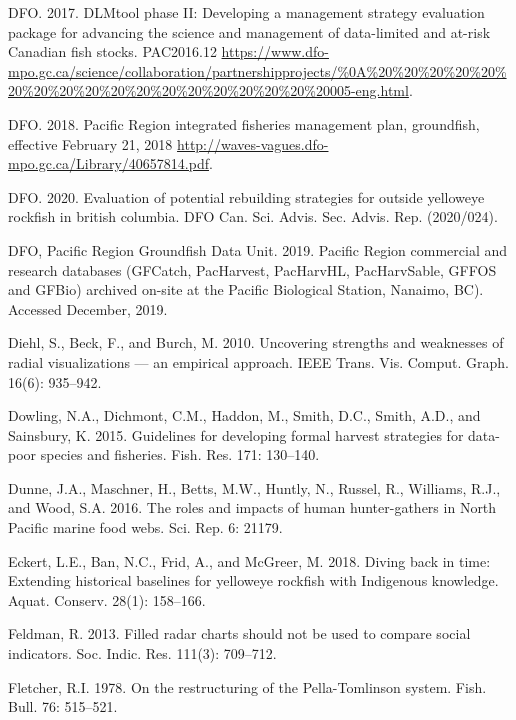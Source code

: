 \documentclass[11pt]{book}
\begin{document}
\leavevmode\hypertarget{ref-dfo_dlmtool_2017}{}%
DFO. 2017. DLMtool phase II: Developing a management strategy evaluation package for advancing the science and management of data-limited and at-risk Canadian fish stocks. PAC2016.12 \url{https://www.dfo-mpo.gc.ca/science/collaboration/partnershipprojects/\%0A\%20\%20\%20\%20\%20\%20\%20\%20\%20\%20\%20\%20\%20\%20\%20\%20\%20\%20005-eng.html}.

\leavevmode\hypertarget{ref-ifmp2018}{}%
DFO. 2018. Pacific Region integrated fisheries management plan, groundfish, effective February 21, 2018 \url{http://waves-vagues.dfo-mpo.gc.ca/Library/40657814.pdf}.

\leavevmode\hypertarget{ref-dfo2020}{}%
DFO. 2020. Evaluation of potential rebuilding strategies for outside yelloweye rockfish in british columbia. DFO Can. Sci. Advis. Sec. Advis. Rep. (2020/024).

\leavevmode\hypertarget{ref-databases2019}{}%
DFO, Pacific Region Groundfish Data Unit. 2019. Pacific Region commercial and research databases (GFCatch, PacHarvest, PacHarvHL, PacHarvSable, GFFOS and GFBio) archived on-site at the Pacific Biological Station, Nanaimo, BC). Accessed December, 2019.

\leavevmode\hypertarget{ref-diehl2010}{}%
Diehl, S., Beck, F., and Burch, M. 2010. Uncovering strengths and weaknesses of radial visualizations --- an empirical approach. IEEE Trans. Vis. Comput. Graph. 16(6): 935--942.

\leavevmode\hypertarget{ref-dowling2015a}{}%
Dowling, N.A., Dichmont, C.M., Haddon, M., Smith, D.C., Smith, A.D., and Sainsbury, K. 2015. Guidelines for developing formal harvest strategies for data-poor species and fisheries. Fish. Res. 171: 130--140.

\leavevmode\hypertarget{ref-dunne2016}{}%
Dunne, J.A., Maschner, H., Betts, M.W., Huntly, N., Russel, R., Williams, R.J., and Wood, S.A. 2016. The roles and impacts of human hunter-gathers in North Pacific marine food webs. Sci. Rep. 6: 21179.

\leavevmode\hypertarget{ref-eckert2018}{}%
Eckert, L.E., Ban, N.C., Frid, A., and McGreer, M. 2018. Diving back in time: Extending historical baselines for yelloweye rockfish with Indigenous knowledge. Aquat. Conserv. 28(1): 158--166.

\leavevmode\hypertarget{ref-feldman2013}{}%
Feldman, R. 2013. Filled radar charts should not be used to compare social indicators. Soc. Indic. Res. 111(3): 709--712.

\leavevmode\hypertarget{ref-fletcher1978}{}%
Fletcher, R.I. 1978. On the restructuring of the Pella-Tomlinson system. Fish. Bull. 76: 515--521.
\end{document}
